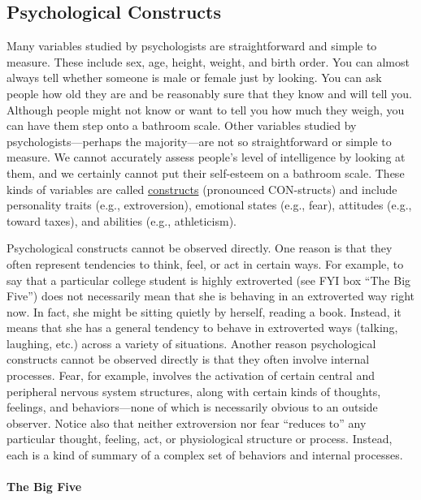 \documentclass[
]{krantz}
\begin{document}
\hypertarget{psychological-constructs}{%
\subsection*{Psychological Constructs}\label{psychological-constructs}}


Many variables studied by psychologists are straightforward and simple to measure. These include sex, age, height, weight, and birth order. You can almost always tell whether someone is male or female just by looking. You can ask people how old they are and be reasonably sure that they know and will tell you. Although people might not know or want to tell you how much they weigh, you can have them step onto a bathroom scale. Other variables studied by psychologists---perhaps the majority---are not so straightforward or simple to measure. We cannot accurately assess people's level of intelligence by looking at them, and we certainly cannot put their self-esteem on a bathroom scale. These kinds of variables are called \protect\hyperlink{construct}{constructs} (pronounced CON-structs) and include personality traits (e.g., extroversion), emotional states (e.g., fear), attitudes (e.g., toward taxes), and abilities (e.g., athleticism).

Psychological constructs cannot be observed directly. One reason is that they often represent tendencies to think, feel, or act in certain ways. For example, to say that a particular college student is highly extroverted (see FYI box ``The Big Five'') does not necessarily mean that she is behaving in an extroverted way right now. In fact, she might be sitting quietly by herself, reading a book. Instead, it means that she has a general tendency to behave in extroverted ways (talking, laughing, etc.) across a variety of situations. Another reason psychological constructs cannot be observed directly is that they often involve internal processes. Fear, for example, involves the activation of certain central and peripheral nervous system structures, along with certain kinds of thoughts, feelings, and behaviors---none of which is necessarily obvious to an outside observer. Notice also that neither extroversion nor fear ``reduces to'' any particular thought, feeling, act, or physiological structure or process. Instead, each is a kind of summary of a complex set of behaviors and internal processes.

\hypertarget{the-big-five}{%
\paragraph*{The Big Five}\label{the-big-five}}
\end{document}
